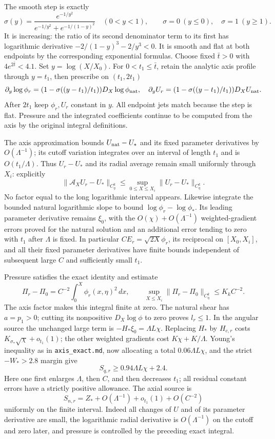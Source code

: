 \documentclass[10pt,a4paper]{article}
\begin{document}
The smooth step is exactly
\[
\sigma(y)=\frac{e^{-1/y^2}}{e^{-1/y^2}+e^{-1/(1-y)^2}}\quad(0<y<1),
\qquad \sigma=0\ (y\le0),\quad\sigma=1\ (y\ge1).
\]
It is increasing: the ratio of its second denominator term to its first has logarithmic derivative \(-2/(1-y)^3-2/y^3<0\). It is smooth and flat at both endpoints by the corresponding exponential formulas. Choose fixed \(\bar t>0\) with \(4e^{2\bar t}<4.1\). Set \(y=\log(X/X_0)\). For \(0<t_1\le\bar t\), retain the analytic axis profile through \(y=t_1\), then prescribe on \((t_1,2t_1)\)
\[
\partial_y\log\phi_r=(1-\sigma((y-t_1)/t_1))D_X\log\phi_{\rm nat},
\quad \partial_yU_r=(1-\sigma((y-t_1)/t_1))D_XU_{\rm nat}.
\]
After \(2t_1\) keep \(\phi_r,U_r\) constant in \(y\). All endpoint jets match because the step is flat. Pressure and the integrated coefficients continue to be computed from the axis by the original integral definitions.

The axis approximation bounds \(U_{\rm nat}-U_*\) and its fixed parameter derivatives by \(O(\Lambda^{-1})\); its cutoff variation integrates over an interval of length \(t_1\) and is \(O(t_1/\Lambda)\). Thus \(U_r-U_*\) and its radial average remain small uniformly through \(X_i\): explicitly
\[
\|\mathcal A_XU_r-U_*\|_{C^k_\eta}
\le\sup_{0\le X\le X_i}\|U_r-U_*\|_{C^k_\eta}.
\]
No factor equal to the long logarithmic interval appears. Likewise integrate the bounded natural logarithmic slope to bound \(\log\phi_r-\log\phi_*\). Its leading parameter derivative remains \(\xi_0\), with the \(O(\chi)+O(\Lambda^{-1})\) weighted-gradient errors proved for the natural solution and an additional error tending to zero with \(t_1\) after \(\Lambda\) is fixed. In particular \(CE_r=\sqrt{2X}\phi_r\), its reciprocal on \([X_0,X_i]\), and all their fixed parameter derivatives have finite bounds independent of subsequent large \(C\) and sufficiently small \(t_1\).

Pressure satisfies the exact identity and estimate
\[
\Pi_r-\Pi_0=C^{-2}\int_0^X\phi_r(x,\eta)^2\,dx,
\qquad \sup_{X\le X_i}\|\Pi_r-\Pi_0\|_{C^k_\eta}\le K_kC^{-2}.
\]
The axis factor makes this integral finite at zero. The natural shear has \(a=p_1>0\); cutting its nonpositive \(D_X\log\phi\) to zero proves \(l_r\le1\). In the angular source the unchanged large term is \(-H_*\xi_0=\Lambda L\chi\). Replacing \(H_*\) by \(H_{c,r}\) costs \(K_{\sigma_*}\sqrt\chi+o_{t_1}(1)\); the other weighted gradients cost \(K\chi+K/\Lambda\). Young's inequality as in \texttt{axis\_exact.md}, now allocating a total \(0.06\Lambda L\chi\), and the strict \(-W_*>2.8\) margin give
\[
S_{q,r}\ge0.94\Lambda L\chi+2.4.
\]
Here one first enlarges \(\Lambda\), then \(C\), and then decreases \(t_1\); all residual constant errors have a strictly positive allowance. The axial source is
\[
S_{n,r}=Z_*+O(\Lambda^{-1})+o_{t_1}(1)+O(C^{-2})
\]
uniformly on the finite interval. Indeed all changes of \(U\) and of its parameter derivative are small, the logarithmic radial derivative is \(O(\Lambda^{-1})\) on the cutoff and zero later, and pressure is controlled by the preceding exact integral.
\end{document}
